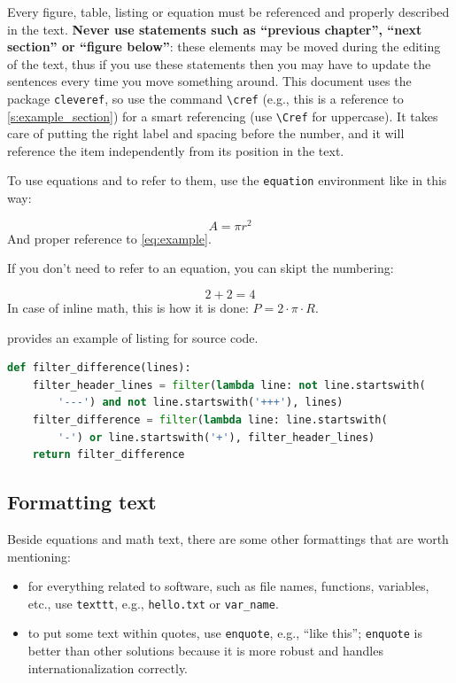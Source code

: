 Every figure, table, listing or equation must be referenced and properly described in the text.
\textbf{Never use statements such as \enquote{previous chapter}, \enquote{next section} or \enquote{figure below}}: these elements may be moved during the editing of the text, thus if you use these statements then you may have to update the sentences every time you move something around.
This document uses the package \texttt{cleveref}, so use the command \texttt{\textbackslash cref} (e.g., this is a reference to \cref{s:example_section}) for a smart referencing (use \texttt{\textbackslash Cref} for uppercase).
It takes care of putting the right label and spacing before the number, and it will reference the item independently from its position in the text.

To use equations and to refer to them, use the \texttt{equation} environment like in this way:

\begin{equation}
\label{eq:example}
A = \pi r^2
\end{equation}
%
And proper reference to \cref{eq:example}.

If you don't need to refer to an equation, you can skipt the numbering:

\[
2 + 2 = 4
\]
%
In case of inline math, this is how it is done: $P = 2 \cdot \pi \cdot R$.

 provides an example of listing for source code.

\begin{lstlisting}[language=Python,
caption={Example of listing.},
label={lst:example-listing},
float=tp]
def filter_difference(lines):
    filter_header_lines = filter(lambda line: not line.startswith(
        '---') and not line.startswith('+++'), lines)
    filter_difference = filter(lambda line: line.startswith(
        '-') or line.startswith('+'), filter_header_lines)
    return filter_difference
\end{lstlisting}


\subsection{Formatting text}

Beside equations and math text, there are some other formattings that are worth mentioning:

\begin{itemize}
\item for everything related to software, such as file names, functions, variables, etc., use \texttt{texttt}, e.g., \texttt{hello.txt} or \texttt{var\_name}.
\item to put some text within quotes, use \texttt{enquote}, e.g., \enquote{like this}; \texttt{enquote} is better than other solutions because it is more robust and handles internationalization correctly.
\end{itemize}

